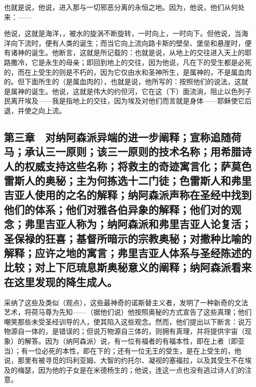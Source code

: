 也就是说，他说，进入那与一切邪恶分离的永恒之地。因为，他说，他们从何处来：——\par

\par

他说，这就是海洋，，被水的旋涡不断旋转，一时向上，一时向下。但他说，当海洋向下流时，便有人类的诞生；而当它向上流向路卡斯的壁垒、堡垒和悬崖时，便有诸神的诞生。他断言，这就是所记载的：也就是说，从地上的交往进入天上的耶路撒冷，它是永生的母亲；即回到地上的交往，因为他说，凡在下的受生都是必死的，而在上受生的则是不朽的，因为它仅由水和圣神所生，是属神的，不是属血肉的。但下面所生的（是属血肉的），也就是说，他所写的：按照他们的说法，这就是属神的诞生。他说，这就是伟大的约但河，它在这（下）面流淌，阻止以色列子民离开埃及——我是指地上的交往，因为埃及对他们而言就是身体——耶稣使它后退，并使之向上流。\par


\subsection{第三章　对纳阿森派异端的进一步阐释；宣称追随荷马；承认三一原则；该三一原则的技术名称；用希腊诗人的权威支持这些名称；将救主的奇迹寓言化；萨莫色雷斯人的奥秘；主为何拣选十二门徒；色雷斯人和弗里吉亚人使用的之名的解释；纳阿森派声称在圣经中找到他们的体系；他们对雅各伯异象的解释；他们对的观念；弗里吉亚人称为；纳阿森派和弗里吉亚人论复活；圣保禄的狂喜；基督所暗示的宗教奥秘；对撒种比喻的解释；应许之地的寓言；弗里吉亚人体系与圣经陈述的比较；对上下厄琉息斯奥秘意义的阐释；纳阿森派看来在这里发现的降生成人。}

采纳了这些及类似（观点），这些最神奇的诺斯替主义者，发明了一种新奇的文法艺术，将荷马尊为先知——（据他们说）他按照奥秘的方式宣告了这些真理；他们嘲笑那些未受圣经训导的人，使其陷入这些观念。然而，他们提出以下断言：说万物源自一体的，是错误的；但说万物源自三体的，则拥有真理，并将提供宇宙（现象）的解答。因为（纳阿森派）说，有一位有福者的有福本性，即在上者（即亚当）；有一位必死的本性，即在下的；还有一位无王的受生，是在上受生的，他说，那里有被寻觅的玛利亚姆、大智的约托尔、凝视的塞福拉，以及其受生不在埃及的梅瑟，因为他的子女是在米德杨生的；他说，连这一点也没有逃过诗人们的注意。\par

